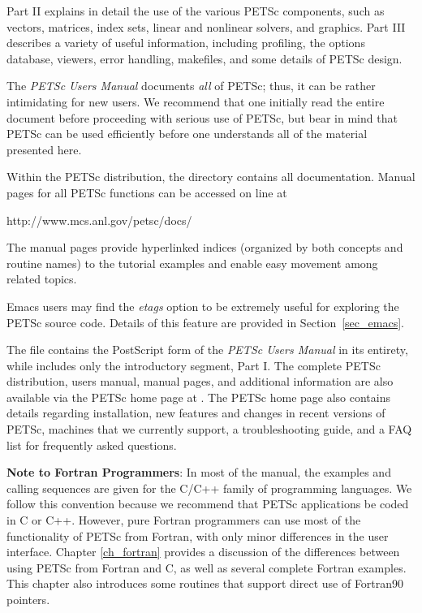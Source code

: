 Part II explains in detail the use of the various PETSc components,
such as vectors, matrices, index sets, linear and nonlinear
solvers, and graphics.  Part III describes a variety of useful
information, including profiling, the options database, viewers, error
handling, makefiles, and some details of
PETSc design.

\nocite{efficient}

The {\em PETSc Users Manual} documents {\em all} of PETSc; thus,
it can be rather intimidating for new users. We recommend that one initially
read the entire document before proceeding with serious use of PETSc,
but bear in mind that PETSc can be used efficiently
before one understands all of the material presented here. 

\medskip \medskip

Within the PETSc distribution, the directory
 contains all documentation.
Manual pages for all PETSc functions can be
accessed on line at
\begin{tabbing}
  http://www.mcs.anl.gov/petsc/docs/
\end{tabbing}
The manual pages
provide hyperlinked indices (organized by
both concepts and routine names) to the tutorial examples and enable
easy movement among related topics.  

Emacs users may find the
{\em etags} option to be extremely useful for exploring the PETSc
source code.  Details of this feature are provided in
Section~\ref{sec_emacs}. 

The file  contains the PostScript form of
the {\em PETSc Users Manual} in its entirety, while  
includes only the introductory segment, Part I.   
The complete PETSc distribution, users
manual, manual pages, and additional information are also available via
the PETSc home page at
.  The PETSc home page also
contains details regarding installation, new features and changes in recent
versions of PETSc, machines that we currently support, a
troubleshooting guide, and a FAQ list for frequently asked questions.

\medskip \medskip

{\bf Note to Fortran Programmers}: In most of the  
manual, the examples and calling sequences are given for the C/C++
family of programming languages.  We follow this convention because we
recommend that PETSc applications be coded in C or C++.
However, pure Fortran programmers can use most of the
functionality of PETSc from Fortran, with only minor differences in
the user interface.  Chapter \ref{ch_fortran} provides a discussion of the
differences between using PETSc from Fortran and C, as well as several
complete Fortran examples.  This chapter also introduces some
routines that support direct use of Fortran90 pointers.


